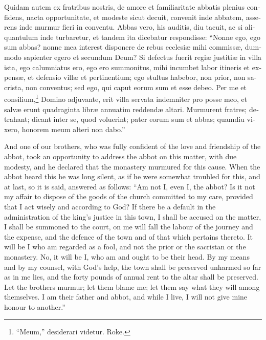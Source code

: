 \documentclass[10pt]{book}
\begin{document}
\begin{paracol}{2}
\switchcolumn*

\begin{otherlanguage}{latin}
Quidam autem ex fratribus nostris, de amore et familiaritate abbatis plenius confidens, nacta opportunitate, et modeste sicut decuit, convenit inde abbatem, asserens inde murmur fieri in conventu. Abbas vero, his auditis, diu tacuit, ac si aliquantulum inde turbaretur, et tandem ita dicebatur respondisse: ``Nonne ego, ego sum abbas? nonne mea interest disponere de rebus ecclesi\ae{} mihi commiss\ae{}, dummodo sapienter egero et secundum Deum? Si defectus fuerit regi\ae{} justiti\ae{} in villa ista, ego calumniatus ero, ego ero summonitus, mihi incumbet labor itineris et expens\ae{}, et defensio vill\ae{} et pertinentium; ego stultus habebor, non prior, non sacrista, non conventus; sed ego, qui caput eorum sum et esse debeo. Per me et consilium,\footnote[\textdagger]{``Meum,'' desiderari videtur. Roke.} Domino adjuvante, erit villa servata indemniter pro posse meo, et salv\ae{} erunt quadraginta libr\ae{} annuatim reddend\ae{} altari. Murmurent fratres; detrahant; dicant inter se, quod voluerint; pater eorum sum et abbas; quamdiu vixero, honorem meum alteri non dabo.''
\end{otherlanguage}

\switchcolumn

And one of our brothers, who was fully confident of the love and friendship of the abbot, took an opportunity to address the abbot on this matter, with due modesty, and he declared that the monastery murmured for this cause. When the abbot heard this he was long silent, as if he were somewhat troubled for this, and at last, so it is said, answered as follows: ``Am not I, even I, the abbot? Is it not my affair to dispose of the goods of the church committed to my care, provided that I act wisely and according to God? If there be a default in the administration of the king's justice in this town, I shall be accused on the matter, I shall be summoned to the court, on me will fall the labour of the journey and the expense, and the defence of the town and of that which pertains thereto. It will be I who am regarded as a fool, and not the prior or the sacristan or the monastery. No, it will be I, who am and ought to be their head. By my means and by my counsel, with God's help, the town shall be preserved unharmed so far as in me lies, and the forty pounds of annual rent to the altar shall be preserved. Let the brothers murmur; let them blame me; let them say what they will among themselves. I am their father and abbot, and while I live, I will not give mine honour to another.''


\end{paracol}
\end{document}
